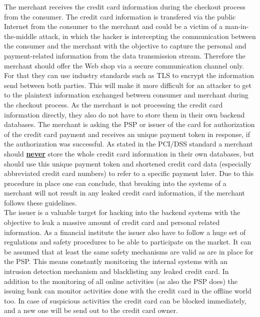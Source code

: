 The merchant receives the credit card information during the checkout process from the consumer. The credit card information is transfered via the public Internet from the consumer to the merchant and could be a victim of a man-in-the-middle attack, in which the hacker is intercepting the communication between the consumer and the merchant with the objective to capture the personal and payment-related information from the data transmission stream. Therefore the merchant should offer the Web shop via a secure communication channel only. For that they can use industry standards such as TLS to encrypt the information send between both parties. This will make it more difficult for an attacker to get to the plaintext information exchanged between consumer and merchant during the checkout process. As the merchant is not processing the credit card information directly, they also do not have to store them in their own backend databases. The merchant is asking the \gls{PSP} or issuer of the card for authorization of the credit card payment and receives an unique payment token in response, if the authorization was successful. As stated in the \gls{PCI/DSS} standard \citep{virtue2009payment} a merchant should \textbf{\underline{never}} store the whole credit card information in their own databases, but should use this unique payment token and shortened credit card data (especially abbreviated credit card numbers) to refer to a specific payment later. Due to this procedure in place one can conclude, that breaking into the systems of a merchant will not result in any leaked credit card information, if the merchant follows these guidelines. \\

The issuer is a valuable target for hacking into the backend systems with the objective to leak a massive amount of credit card and personal related information. As a financial institute the issuer also have to follow a huge set of regulations and safety procedures to be able to participate on the market. It can be assumed that at least the same safety mechanisms are valid as are in place for the \gls{PSP}. This means constantly monitoring the internal systems with an intrusion detection mechanism and blacklisting any leaked credit card. In addition to the monitoring of all online activities (as also the \gls{PSP} does) the issuing bank can monitor activities done with the credit card in the offline world too. In case of suspicious activities the credit card can be blocked immediately, and a new one will be send out to the credit card owner. \\

